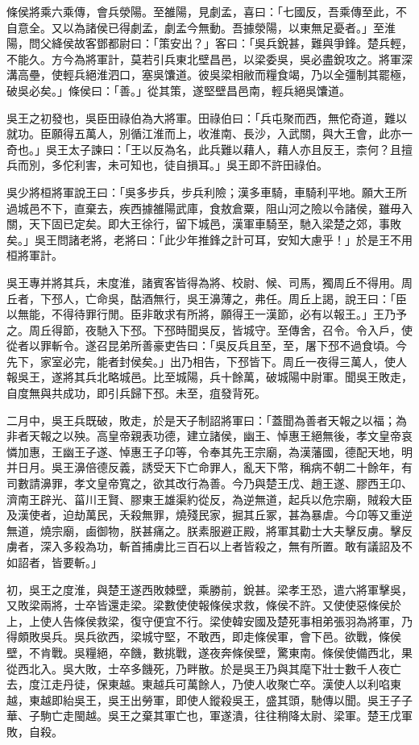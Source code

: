 \begin{pinyinscope}
條侯將乘六乘傳，會兵滎陽。至雒陽，見劇孟，喜曰：「七國反，吾乘傳至此，不自意全。又以為諸侯已得劇孟，劇孟今無動。吾據滎陽，以東無足憂者。」至淮陽，問父絳侯故客鄧都尉曰：「策安出？」客曰：「吳兵銳甚，難與爭鋒。楚兵輕，不能久。方今為將軍計，莫若引兵東北壁昌邑，以梁委吳，吳必盡銳攻之。將軍深溝高壘，使輕兵絕淮泗口，塞吳馕道。彼吳梁相敝而糧食竭，乃以全彊制其罷極，破吳必矣。」條侯曰：「善。」從其策，遂堅壁昌邑南，輕兵絕吳馕道。

吳王之初發也，吳臣田祿伯為大將軍。田祿伯曰：「兵屯聚而西，無佗奇道，難以就功。臣願得五萬人，別循江淮而上，收淮南、長沙，入武關，與大王會，此亦一奇也。」吳王太子諫曰：「王以反為名，此兵難以藉人，藉人亦且反王，柰何？且擅兵而別，多佗利害，未可知也，徒自損耳。」吳王即不許田祿伯。

吳少將桓將軍說王曰：「吳多步兵，步兵利險；漢多車騎，車騎利平地。願大王所過城邑不下，直棄去，疾西據雒陽武庫，食敖倉粟，阻山河之險以令諸侯，雖毋入關，天下固已定矣。即大王徐行，留下城邑，漢軍車騎至，馳入梁楚之郊，事敗矣。」吳王問諸老將，老將曰：「此少年推鋒之計可耳，安知大慮乎！」於是王不用桓將軍計。

吳王專并將其兵，未度淮，諸賓客皆得為將、校尉、候、司馬，獨周丘不得用。周丘者，下邳人，亡命吳，酤酒無行，吳王濞薄之，弗任。周丘上謁，說王曰：「臣以無能，不得待罪行閒。臣非敢求有所將，願得王一漢節，必有以報王。」王乃予之。周丘得節，夜馳入下邳。下邳時聞吳反，皆城守。至傳舍，召令。令入戶，使從者以罪斬令。遂召昆弟所善豪吏告曰：「吳反兵且至，至，屠下邳不過食頃。今先下，家室必完，能者封侯矣。」出乃相告，下邳皆下。周丘一夜得三萬人，使人報吳王，遂將其兵北略城邑。比至城陽，兵十餘萬，破城陽中尉軍。聞吳王敗走，自度無與共成功，即引兵歸下邳。未至，疽發背死。

二月中，吳王兵既破，敗走，於是天子制詔將軍曰：「蓋聞為善者天報之以福；為非者天報之以殃。高皇帝親表功德，建立諸侯，幽王、悼惠王絕無後，孝文皇帝哀憐加惠，王幽王子遂、悼惠王子卬等，令奉其先王宗廟，為漢藩國，德配天地，明并日月。吳王濞倍德反義，誘受天下亡命罪人，亂天下幣，稱病不朝二十餘年，有司數請濞罪，孝文皇帝寬之，欲其改行為善。今乃與楚王戊、趙王遂、膠西王卬、濟南王辟光、菑川王賢、膠東王雄渠約從反，為逆無道，起兵以危宗廟，賊殺大臣及漢使者，迫劫萬民，夭殺無罪，燒殘民家，掘其丘冢，甚為暴虐。今卬等又重逆無道，燒宗廟，鹵御物，朕甚痛之。朕素服避正殿，將軍其勸士大夫擊反虜。擊反虜者，深入多殺為功，斬首捕虜比三百石以上者皆殺之，無有所置。敢有議詔及不如詔者，皆要斬。」

初，吳王之度淮，與楚王遂西敗棘壁，乘勝前，銳甚。梁孝王恐，遣六將軍擊吳，又敗梁兩將，士卒皆還走梁。梁數使使報條侯求救，條侯不許。又使使惡條侯於上，上使人告條侯救梁，復守便宜不行。梁使韓安國及楚死事相弟張羽為將軍，乃得頗敗吳兵。吳兵欲西，梁城守堅，不敢西，即走條侯軍，會下邑。欲戰，條侯壁，不肯戰。吳糧絕，卒饑，數挑戰，遂夜奔條侯壁，驚東南。條侯使備西北，果從西北入。吳大敗，士卒多饑死，乃畔散。於是吳王乃與其麾下壯士數千人夜亡去，度江走丹徒，保東越。東越兵可萬餘人，乃使人收聚亡卒。漢使人以利啗東越，東越即紿吳王，吳王出勞軍，即使人鏦殺吳王，盛其頭，馳傳以聞。吳王子子華、子駒亡走閩越。吳王之棄其軍亡也，軍遂潰，往往稍降太尉、梁軍。楚王戊軍敗，自殺。


\end{pinyinscope}
